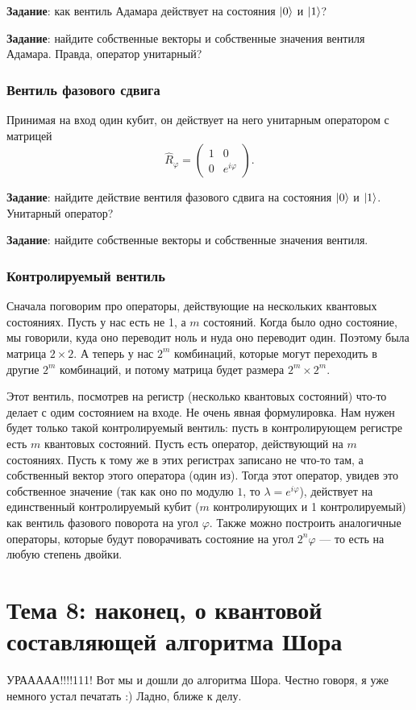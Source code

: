 \documentclass[12pt]{article}
\begin{document}
{\bf Задание}: как вентиль Адамара действует на состояния $\Ket{0}$ и $\Ket{1}$?

{\bf Задание}: найдите собственные векторы и собственные значения вентиля Адамара. Правда, оператор унитарный?

\subsubsection*{Вентиль фазового сдвига}
Принимая на вход один кубит, он действует на него унитарным оператором с матрицей $$\hat{R}_{\varphi} = \begin{pmatrix}1 & 0 \\ 0 & e^{i \varphi}\end{pmatrix}.$$

{\bf Задание}: найдите действие вентиля фазового сдвига на состояния $\Ket{0}$ и $\Ket{1}$. Унитарный оператор?

{\bf Задание}: найдите собственные векторы и собственные значения вентиля.

\subsubsection*{Контролируемый вентиль}
Сначала поговорим про операторы, действующие на нескольких квантовых состояниях. Пусть у нас есть не 1, а $m$ состояний. Когда было одно состояние, мы говорили, куда оно переводит ноль и нуда оно переводит один. Поэтому была матрица $2 \times 2$. А теперь у нас $2^m$ комбинаций, которые могут переходить в другие $2^m$ комбинаций, и потому матрица будет размера $2^m \times 2^m$.

Этот вентиль, посмотрев на регистр (несколько квантовых состояний) что-то делает с одим состоянием на входе. Не очень явная формулировка. Нам нужен будет только такой контролируемый вентиль: пусть в контролирующем регистре есть $m$ квантовых состояний. Пусть есть оператор, действующий на $m$ состояниях. Пусть к тому же в этих регистрах записано не что-то там, а собственный вектор этого оператора (один из). Тогда этот оператор, увидев это собственное значение (так как оно по модулю $1$, то $\lambda = e^{i \varphi}$), действует на единственный контролируемый кубит ($m$ контролирующих и 1 контролируемый) как вентиль фазового поворота на угол $\varphi$. Также можно построить аналогичные операторы, которые будут поворачивать состояние на угол $2^n \varphi$ --- то есть на любую степень двойки.

\section*{Тема 8: наконец, о квантовой составляющей алгоритма Шора}
УРААААА!!!!111! Вот мы и дошли до алгоритма Шора. Честно говоря, я уже немного устал печатать :) Ладно, ближе к делу.
\end{document}

